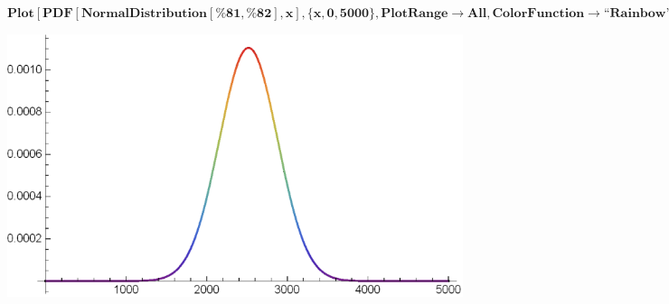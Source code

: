 \documentclass{article}
\newcommand{\unicode}[1]{{}}
\begin{document}
\begin{doublespace}
\noindent\(\pmb{\text{Plot}[\text{PDF}[\text{NormalDistribution}[\text{$\%$81},\text{$\%$82}],x],\{x,0,5000\},\text{PlotRange}\to \text{All},\text{ColorFunction}\to
\text{{``}Rainbow{''}}]}\)
\end{doublespace}

\includegraphics{Modelling Practice_gr3.eps}

$\unicode{6a21}\unicode{578b}\unicode{8f83}\unicode{4e3a}\unicode{7c97}\unicode{7cd9}\unicode{ff0c}\unicode{4f46}\unicode{662f}\unicode{603b}\unicode{4f53}\unicode{6b63}\unicode{786e}\unicode{53cd}\unicode{6620}\unicode{4e86}\unicode{53d8}\unicode{91cf}\unicode{7684}\unicode{5173}\unicode{7cfb}\unicode{3002}\unicode{5176}\unicode{6807}\unicode{51c6}\unicode{5dee}\unicode{4e0e}\unicode{5e73}\unicode{5747}\unicode{503c}\unicode{6bd4}\unicode{503c}\unicode{8f83}\unicode{5927}\unicode{ff0c}\unicode{53ef}\unicode{9760}\unicode{7a0b}\unicode{5ea6}\unicode{4f4e}\unicode{3002}\unicode{9700}\unicode{8981}\unicode{8fdb}\unicode{4e00}\unicode{6b65}\unicode{5b8c}\unicode{5584}\unicode{3002}$
\end{document}
